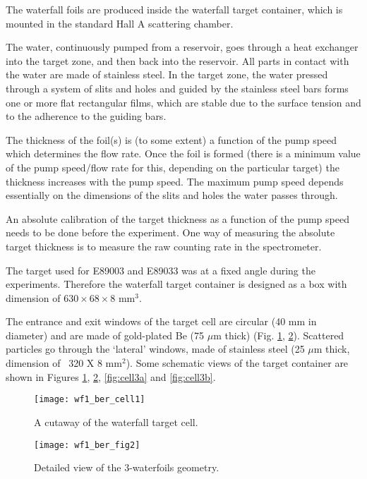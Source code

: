 The waterfall foils are produced inside the waterfall target container,
which is mounted in the standard Hall A scattering chamber. 

The water, continuously pumped from a reservoir, goes through a heat exchanger
into the target zone, and then back into the reservoir. All parts in contact 
with the water are made of stainless steel. In the target zone, the water pressed through a system of slits and holes and guided by the stainless steel bars
forms one or more flat rectangular films,
which are stable due to the surface tension and to the adherence to the guiding bars.

The thickness of the foil(s) is (to some extent) a function of the 
pump speed which determines the flow rate.  
Once the foil is formed (there is a 
minimum value of the pump speed/flow rate for this, depending on the 
particular target) the thickness increases with the pump speed. The 
maximum pump speed depends essentially on the dimensions of the
slits and holes the water passes through. 

An absolute calibration of the target thickness as a function of the
 pump speed needs to be done before the experiment.
One way of measuring the absolute target thickness 
is to  measure the raw counting rate in the spectrometer.

The target used for E89003 and E89033 was at a fixed angle during the 
experiments. Therefore the waterfall target container is designed as a box
with dimension of $630\times68\times8$ mm$^3$. 

The entrance and exit windows of the target cell are 
circular (40 mm in diameter) and are made of gold-plated Be (75 $\mu$m thick)
(Fig. \ref{fig:wf1_cell1}, \ref{fig:cell2}).
Scattered particles go through the `lateral' windows, made of 
stainless steel (25 $\mu$m thick, dimension of ~320 X 8 mm$^2$).
Some schematic views of the target container are shown 
in Figures \ref{fig:wf1_cell1},
\ref{fig:cell2}, \ref{fig:cell3a} and \ref{fig:cell3b}. 

\begin{figure}[htp]
\begin{center}
\texttt{[image: wf1\_ber\_cell1]}
\caption[Waterfall Target: Cutaway of Target Cell]{A cutaway of the waterfall target cell.}
\label{fig:wf1_cell1}
\end{center}
\end{figure}

\begin{figure}[htp]
\begin{center}
\texttt{[image: wf1\_ber\_fig2]}
\caption[Waterfall Target: Three Foil Geometry]{Detailed view of the 3-waterfoils geometry.}
\label{fig:cell2}
\end{center}
\end{figure}

